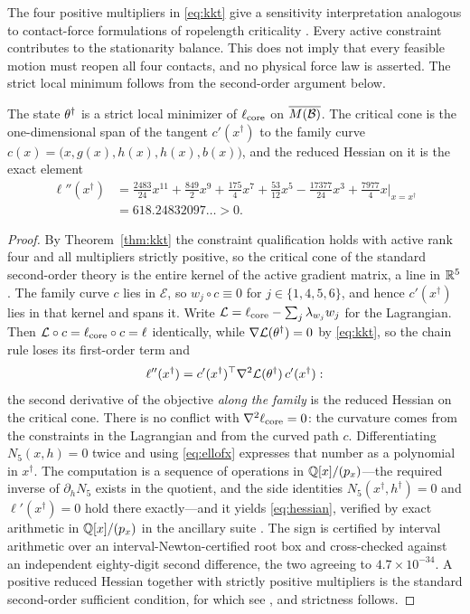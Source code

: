 The four positive multipliers in \eqref{eq:kkt} give a sensitivity interpretation analogous to contact-force formulations of ropelength criticality \cite{svdm2004,cks2002}. Every active constraint contributes to the stationarity balance. This does not imply that every feasible motion must reopen all four contacts, and no physical force law is asserted. The strict local minimum follows from the second-order argument below.

\begin{theorem}\label{thm:sosc}
The state $\theta^\dagger$ is a strict local minimizer of $\ell_{\mathrm{core}}$ on $\overline{M(\mathcal{B})}$. The critical cone is the one-dimensional span of the tangent $c'(x^\dagger)$ to the family curve $c(x)=\bigl(x,g(x),h(x),h(x),b(x)\bigr)$, and the reduced Hessian on it is the exact element
\begin{equation}\label{eq:hessian}
\begin{aligned}
  \ell''(x^\dagger)&=\tfrac{2483}{24}x^{11}+\tfrac{849}2x^{9}+\tfrac{175}4x^{7}+\tfrac{53}{12}x^{5}-\tfrac{17377}{24}x^{3}+\tfrac{7977}4x\Big|_{x=x^\dagger}\\
  &=618.24832097\ldots>0 .
\end{aligned}
\end{equation}
\end{theorem}

\begin{proof}
By Theorem~\ref{thm:kkt} the constraint qualification holds with active rank four and all multipliers strictly positive, so the critical cone of the standard second-order theory is the entire kernel of the active gradient matrix, a line in $\mathbb{R}^5$. The family curve $c$ lies in $\mathcal E$, so $w_j\circ c\equiv0$ for $j\in\{1,4,5,6\}$, and hence $c'(x^\dagger)$ lies in that kernel and spans it. Write $\mathcal L=\ell_{\mathrm{core}}-\sum_j\lambda_{w_j}w_j$ for the Lagrangian. Then $\mathcal L\circ c=\ell_{\mathrm{core}}\circ c=\ell$ identically, while $\nabla\mathcal L(\theta^\dagger)=0$ by \eqref{eq:kkt}, so the chain rule loses its first-order term and
\[
  \ell''(x^\dagger)=c'(x^\dagger)^{\top}\nabla^2\mathcal L(\theta^\dagger)\,c'(x^\dagger) :
\]
the second derivative of the objective \emph{along the family} is the reduced Hessian on the critical cone. There is no conflict with $\nabla^2\ell_{\mathrm{core}}=0$: the curvature comes from the constraints in the Lagrangian and from the curved path $c$. Differentiating $N_5(x,h)=0$ twice and using \eqref{eq:ellofx} expresses that number as a polynomial in $x^\dagger$. The computation is a sequence of operations in $\mathbb{Q}[x]/(p_x)$---the required inverse of $\partial_hN_5$ exists in the quotient, and the side identities $N_5(x^\dagger,h^\dagger)=0$ and $\ell'(x^\dagger)=0$ hold there exactly---and it yields \eqref{eq:hessian}, verified by exact arithmetic in $\mathbb{Q}[x]/(p_x)$ in the ancillary suite \cite{anc}. The sign is certified by interval arithmetic over an interval-Newton-certified root box and cross-checked against an independent eighty-digit second difference, the two agreeing to $4.7\times10^{-34}$. A positive reduced Hessian together with strictly positive multipliers is the standard second-order sufficient condition, for which see \cite{nocedal2006}, and strictness follows.
\end{proof}

